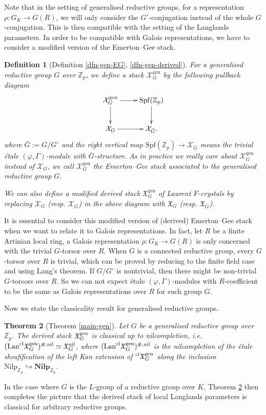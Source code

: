 \documentclass[10pt]{article}
\newtheorem{thm}{Theorem}[section]
\newtheorem{dfn}[thm]{Definition}
\numberwithin{equation}{section}
\newcommand{\frakX}{{\mathfrak X}}
\newcommand{\bZ}{{\mathbb Z}}
\newcommand{\calX}{{\mathcal X}}
\newcommand{\Lan}{{\mathrm{Lan}}}
\newcommand{\nil}{\mathrm{nil}}
\newcommand{\Spf}{{\mathrm{Spf}}}           %
\newcommand{\cl}{{\mathrm{\rm cl}}}             %
\newcommand{\gen}{{\mathrm{gen}}}
\newcommand{\Nilp}{\mathrm{Nilp}}
\begin{document}
Note that in the setting of generalised reductive groups, for a representation $\rho:G_K\to G(R)$, we will only consider the $G^\circ$-conjugation instead of the whole $G$-conjugation. This is then compatible with the setting of the Langlands parameters. In order to be compatible with Galois representations, we have to consider a modified version of the Emerton--Gee stack.

\begin{dfn}[Definition \ref{dfn-gen-EG}, \ref{dfn-gen-derived}]\label{intro-dfn}
      For a generalised reductive group $G$ over $\bZ_p$, we define a stack $\calX_G^{\gen}$ by the following pullback diagram
    \begin{equation}
        \xymatrix{
        \calX_G^{\gen}\ar[r]\ar[d]& \Spf(\bZ_p)\ar[d]\\
        \calX_G\ar[r]& \calX_{\bar G}.
        }
    \end{equation}
    where $\bar G:=G/G^{\circ}$ and the right vertical map $\Spf(\bZ_p)\to \calX_{\bar G}$ means the trivial \'etale $(\varphi,\Gamma)$-module with $\bar G$-structure. As in practice we really care about $\calX_G^{\gen}$ instead of $\calX_G$, we call $\calX_G^{\gen}$ the Emerton--Gee stack associated to the generalised reductive group $G$.
    
    We can also define a modified derived stack $\frakX_G^{\gen}$ of Laurent $F$-crystals by replacing $\calX_G$ (resp. $\calX_{\bar G}$)  in the above diagram with $\frakX_G$ (resp. $\frakX_{\bar G}$).
\end{dfn}


    It is essential to consider this modified version of (derived) Emerton--Gee stack when we want to relate it to Galois representations. In fact, let $R$ be a finite Artinian local ring, a Galois representation $\rho:G_K\to G(R)$ is only concerned with the trivial $G$-torsor over $R$. When $G$ is a connected reductive group, every $G$-torsor over $R$ is trivial, which can be proved by reducing to the finite field case and using Lang's theorem. If $G/G^{\circ}$ is nontrivial, then there might be non-trivial $G$-torsors over $R$. So we can not expect \'etale $(\varphi,\Gamma)$-modules with $R$-coefficient to be the same as Galois representations over $R$ for such group $G$. 

    Now we state the classicality result for generalised reductive groups.

    \begin{thm}[Theorem \ref{main-gen}]\label{gen}
         Let $G$ be a generalised reductive group over $\bZ_p$. The derived stack $\frakX^{\rm gen}_G$ is classical up to nilcompletion, i.e. $(\Lan ^{\cl}\frakX^{\rm gen}_G)^{\#,\nil}\simeq \frakX_G^{\nil}$, where $(\Lan ^{\cl}\frakX^{\rm gen}_G)^{\#,\nil}$ is the nilcompletion of the \'etale sheafification of the left Kan extension of $^{\cl}\frakX^{\rm gen}_G$ along the inclusion $\Nilp_{\bZ_p}\hookrightarrow \textbf{Nilp}_{\bZ_p}$.
    \end{thm}
    In the case where $G$ is the $L$-group of a reductive group over $K$, Theorem \ref{gen} then completes the picture that the derived stack of local Langlands parameters is classical for arbitrary reductive groups.
\end{document}
